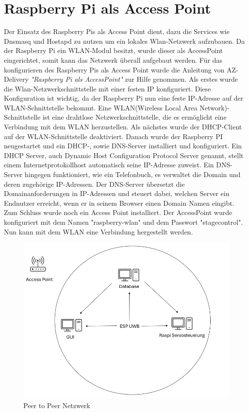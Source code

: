 \section{Raspberry Pi als Access Point}
Der Einsatz des Raspberry Pis als Access Point dient, dazu die Services wie Dnsmasq und Hostapd zu nutzen um ein lokales Wlan-Netzwerk aufzubauen. Da der Raspberry Pi ein WLAN-Modul besitzt, wurde dieser als AccessPoint eingerichtet, somit kann das Netzwerk überall aufgebaut werden.  
Für das konfigurieren des Raspberry Pis als Access Point wurde die Anleitung von AZ-Delivery \textit{"Raspberry Pi als AccessPoint"} zur Hilfe genommen. Als erstes wurde die Wlan-Netzwerkschnittstelle mit einer festen IP konfiguriert. Diese Konfiguration ist wichtig, da der Raspberry Pi nun eine feste IP-Adresse auf der WLAN-Schnittstelle bekommt. Eine WLAN(Wireless Local Area Network)-Schnittstelle ist eine drahtlose Netzwerkschnittstelle, die es ermöglicht eine Verbindung mit dem WLAN herzustellen. Als nächstes wurde der DHCP-Client auf der WLAN-Schnittstelle deaktiviert.  Danach wurde der Raspberry PI neugestartet und ein DHCP-, sowie DNS-Server installiert und konfiguriert. Ein DHCP Server, auch Dynamic Host Configuration Protocol Server genannt, stellt einem Internetprotokollhost automatisch seine IP-Adresse zuweist. Ein DNS-Server hingegen funktioniert, wie ein Telefonbuch, es verwaltet die Domain und deren zugehörige IP-Adressen. Der DNS-Server übersetzt die Domainanforderungen in IP-Adressen und steuert dabei, welchen Server ein Endnutzer erreicht, wenn er in seinem Browser einen Domain Namen eingibt.  Zum Schluss wurde noch ein Access Point installiert. Der AccessPoint wurde konfiguriert mit dem Namen "raspberry-wlan" und dem Passwort "stagecontrol". Nun kann mit dem WLAN eine Verbindung hergestellt werden. \parencite{RaspberryPiAccessPoint}

\begin{figure}[H]
	\centering
	\includegraphics[width=0.5\linewidth]{images/Peer to Peer Netzwerk.png}
	\caption[Peer to Peer Netzwerk]{Peer to Peer Netzwerk}
	\label{fig:Peer to Peer Netzwerk} 
\end{figure}

